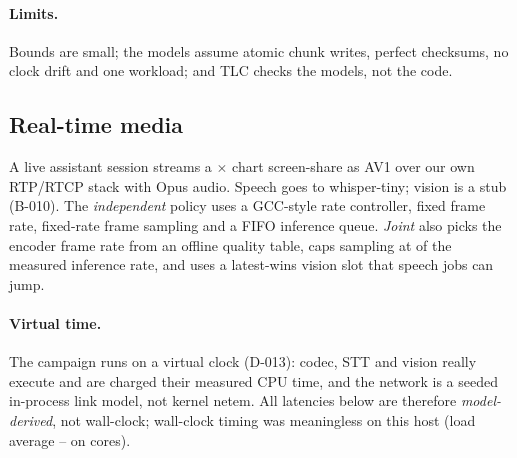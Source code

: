 \paragraph{Limits.} Bounds are small; the models assume atomic chunk writes, perfect checksums, no clock
drift and one workload; and TLC checks the models, not the code.

\subsection{Real-time media}
\label{sec:ext-media}

A live assistant session streams a $\times$ chart screen-share as AV1 over our own
RTP/RTCP stack with Opus audio. Speech goes to
whisper-tiny; vision is a stub (B-010). The
\emph{independent} policy uses a GCC-style rate controller, fixed frame rate, fixed-rate frame sampling and
a FIFO inference queue. \emph{Joint} also picks the encoder frame rate from an offline quality table, caps
sampling at  of the measured inference rate, and uses a latest-wins vision slot that speech jobs
can jump.

\paragraph{Virtual time.} The campaign runs on a virtual clock (D-013): codec, STT and vision really
execute and are charged their measured CPU time, and the network is a seeded in-process link model, not
kernel netem. All latencies below are therefore \emph{model-derived}, not wall-clock; wall-clock timing
was meaningless on this host (load average \CmediaLoadMin--\CmediaLoadMax{} on  cores).

